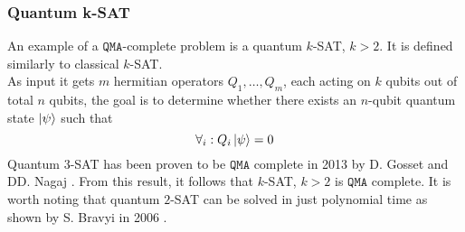 \subsubsection{Quantum k-SAT}
An example of a $\mathtt{QMA}$-complete problem is a quantum $k$-SAT, $k>2$. It is defined similarly to classical $k$-SAT.\\
As input it gets $m$ hermitian operators $Q_1,\dots, Q_m$, each acting on $k$ qubits out of total $n$ qubits, the goal is to determine whether there exists an $n$-qubit quantum state $\ket{\psi}$ such that 
$$\forall_i: Q_i \ket{\psi}=0$$ 
Quantum $3$-SAT has been proven to be $\mathtt{QMA}$ complete in 2013 by D. Gosset and DD. Nagaj \cite{gosset}. From this result, it follows that $k$-SAT, $k>2$ is $\mathtt{QMA}$ complete. It is worth noting that quantum $2$-SAT can be solved in just polynomial time as shown by S. Bravyi in 2006 \cite{brav}. 

